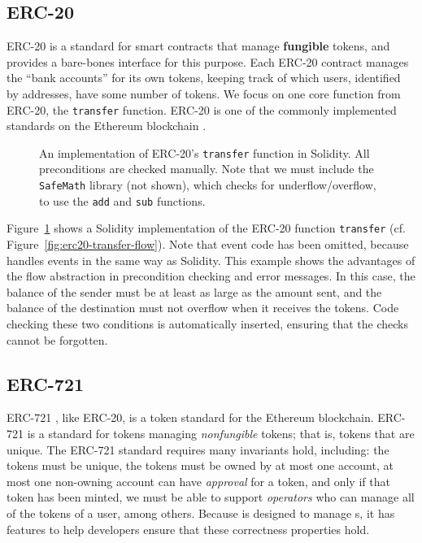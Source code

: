 \documentclass[dvipsnames, usenames, sigconf]{acmart}
\begin{document}
\subsection{ERC-20}\label{sec:erc20-impl}
ERC-20  is a standard for smart contracts that manage \textbf{fungible} tokens, and provides a bare-bones interface for this purpose.
Each ERC-20 contract manages the ``bank accounts'' for its own tokens, keeping track of which users, identified by addresses, have some number of tokens.
We focus on one core function from ERC-20, the \lstinline{transfer} function.
ERC-20 is one of the commonly implemented standards on the Ethereum blockchain .
\begin{figure}[h]
    \centering
    
    \caption{An implementation of ERC-20's \lstinline{transfer} function in Solidity.
        All preconditions are checked manually.
        Note that we must include the \lstinline{SafeMath} library (not shown), which checks for underflow/overflow, to use the \lstinline{add} and \lstinline{sub} functions.}
    \label{fig:erc20-transfer-sol}
\end{figure}
Figure~\ref{fig:erc20-transfer-sol} shows a Solidity implementation of the ERC-20 function \lstinline{transfer} (cf. Figure~\ref{fig:erc20-transfer-flow}).
Note that event code has been omitted, because \langName handles events in the same way as Solidity.
This example shows the advantages of the flow abstraction in precondition checking and error messages. 
In this case, the balance of the sender must be at least as large as the amount sent, and the balance of the destination must not overflow when it receives the tokens.
Code checking these two conditions is automatically inserted, ensuring that the checks cannot be forgotten.

\subsection{ERC-721}\label{sec:erc721-impl}
ERC-721 , like ERC-20, is a token standard for the Ethereum blockchain.
ERC-721 is a standard for tokens managing \emph{nonfungible} tokens; that is, tokens that are unique.
The ERC-721 standard requires many invariants hold, including:
    the tokens must be unique,
    the tokens must be owned by at most one account,
    at most one non-owning account can have \emph{approval} for a token, and only if that token has been minted,
    we must be able to support \emph{operators} who can manage all of the tokens of a user,
    among others.
Because \langName is designed to manage \assetTxt{}s, it has features to help developers ensure that these correctness properties hold.
\end{document}
